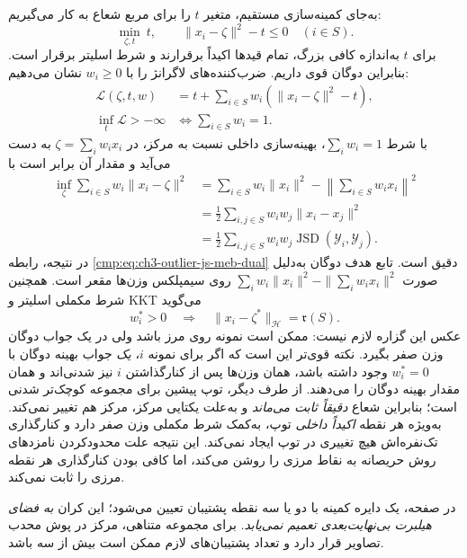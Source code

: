 به‌جای کمینه‌سازی مستقیم، متغیر
$t$ را برای مربع شعاع به کار
می‌گیریم:
\[
\min_{\zeta,t}\ t,\qquad
\|x_i-\zeta\|^2-t\le0
\quad(i\in S).
\]
برای $t$ به‌اندازه کافی بزرگ،
تمام قیدها اکیداً برقرارند
و شرط اسلیتر برقرار است.
بنابراین دوگان قوی داریم.
ضرب‌کننده‌های لاگرانژ را با
$w_i\ge0$ نشان می‌دهیم:
\begin{equation}\label{eq:app-ch3-js-meb-lagrangian}
\begin{aligned}
\mathcal L(\zeta,t,w)
&=t+\sum_{i\in S}w_i
(\|x_i-\zeta\|^2-t),\\
\inf_t\mathcal L>-\infty
&\Longleftrightarrow
\sum_{i\in S}w_i=1.
\end{aligned}
\end{equation}
با شرط $\sum_iw_i=1$،
بهینه‌سازی داخلی نسبت به مرکز،
در $\zeta=\sum_iw_ix_i$ به دست
می‌آید و مقدار آن برابر است با
\begin{equation}\label{eq:app-ch3-js-meb-dual-proof}
\begin{aligned}
\inf_{\zeta}\sum_{i\in S}
w_i\|x_i-\zeta\|^2
&=\sum_{i\in S}w_i\|x_i\|^2
-\left\|\sum_{i\in S}w_ix_i\right\|^2\\
&=\frac12\sum_{i,j\in S}
w_iw_j\|x_i-x_j\|^2\\
&=\frac12\sum_{i,j\in S}
w_iw_j\operatorname{JSD}
(\mathscr Y_i,\mathscr Y_j).
\end{aligned}
\end{equation}
در نتیجه، رابطه
\eqref{cmp:eq:ch3-outlier-js-meb-dual}
دقیق است. تابع هدف دوگان
به‌دلیل صورت
$\sum_iw_i\|x_i\|^2-
\|\sum_iw_ix_i\|^2$
روی سیمپلکس وزن‌ها
مقعر است. همچنین شرط
مکملی اسلیتر و KKT می‌گوید
\begin{equation}\label{eq:app-ch3-js-meb-support-kkt}
w_i^*>0
\quad\Longrightarrow\quad
\|x_i-\zeta^*\|_{\mathcal H}
=\mathfrak r(S).
\end{equation}
عکس این گزاره لازم نیست:
ممکن است نمونه روی مرز باشد
ولی در یک جواب دوگان وزن صفر بگیرد.
نکته قوی‌تر این است که اگر
برای نمونه $i$، \emph{یک}
جواب بهینه دوگان با
$w_i^*=0$ وجود داشته باشد،
همان وزن‌ها پس از کنارگذاشتن
$i$ نیز شدنی‌اند و
همان مقدار بهینه دوگان را
می‌دهند. از طرف دیگر، توپ
پیشین برای مجموعه کوچک‌تر
شدنی است؛ بنابراین شعاع
\emph{دقیقاً ثابت می‌ماند} و
به‌علت یکتایی مرکز،
مرکز هم تغییر نمی‌کند.
به‌ویژه هر نقطه
\emph{اکیداً داخلی} توپ،
به‌کمک شرط مکملی وزن
صفر دارد و کنارگذاری
تک‌نفره‌اش هیچ تغییری در
توپ ایجاد نمی‌کند.
این نتیجه علت محدودکردن
نامزدهای روش حریصانه به
نقاط مرزی را روشن می‌کند،
اما کافی بودن کنارگذاری
هر نقطه مرزی را ثابت نمی‌کند.

در صفحه، یک دایره کمینه با
دو یا سه نقطه پشتیبان تعیین
می‌شود؛ این کران \emph{به فضای
هیلبرت بی‌نهایت‌بعدی تعمیم نمی‌یابد}.
برای مجموعه متناهی، مرکز در
پوش محدب تصاویر قرار دارد و
تعداد پشتیبان‌های لازم ممکن است
بیش از سه باشد.

